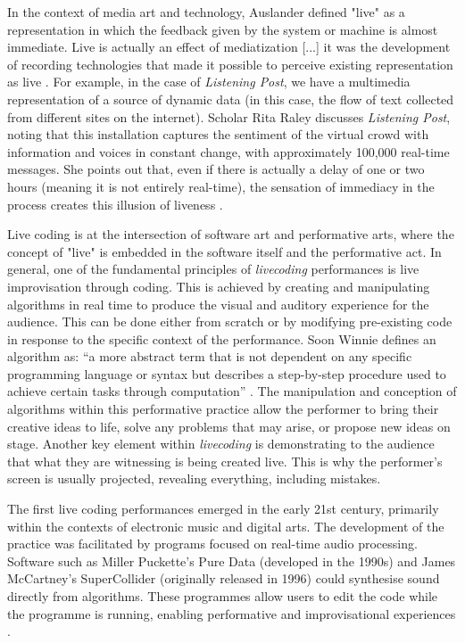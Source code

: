 \documentclass[12pt, twoside, a4paper]{report}
\begin{document}
In the context of media art and technology, Auslander defined "live" as a representation in which the feedback 
given by the system or machine is almost immediate.
 Live is actually an effect of mediatization [...] it was the development of recording technologies that 
 made it possible to perceive existing representation as live \citep{auslander2022liveness}.  
 For example, in the case of \textit{Listening Post}, we have a multimedia representation of a source of dynamic data 
 (in this case, the flow of text collected from different sites on the internet). 
 Scholar Rita Raley discusses \textit{Listening Post}, noting that this installation captures the sentiment of the virtual crowd with information and voices in constant change, with approximately 100,000 real-time messages. She points out that, even if there is actually a delay of one or two hours (meaning it is not entirely real-time), the sensation of immediacy in the process creates this illusion of liveness \citep{raley2009list}.

Live coding is at the intersection of software art and performative arts, where the concept of "live" is embedded in the software itself and the performative act. In general, one of the fundamental principles of \textit{livecoding} performances is live improvisation through coding. This is achieved by creating and manipulating algorithms in real time to produce the visual and auditory experience for the audience. This can be done either from scratch or by modifying pre-existing code in response to the specific context of the performance. Soon Winnie defines an algorithm as: “a more abstract term that is not dependent on any specific programming language or syntax but describes a step-by-step procedure used to achieve certain tasks through computation” \citep{soon2018executing}.  The manipulation and conception of algorithms within this performative practice allow the performer to bring their creative ideas to life, solve any problems that may arise, or propose new ideas on stage. Another key element within \textit{livecoding} is demonstrating to the audience that what they are witnessing is being created live. This is why the performer's screen is usually projected, revealing everything, including mistakes. 

  The first live coding performances emerged in the early 21st century, primarily within the contexts of electronic music and digital arts. 
The development of the practice was facilitated by programs focused on real-time audio processing. Software such as Miller Puckette’s Pure Data (developed in the 1990s) and James McCartney’s SuperCollider (originally released in 1996) could synthesise sound directly from algorithms. These programmes allow users to edit the code while the programme is running, enabling performative and improvisational experiences \citep{usermanual}.
\end{document}
